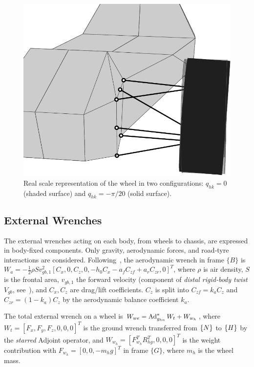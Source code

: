 \begin{figure}[h]
	\centering
	\includegraphics[scale = .6]{Images/camber_showing}
	\caption{Real scale representation of the wheel in two configurations: $q_{hk}=0$ (shaded surface) and $q_{hk}=-\pi/20$ (solid surface).}
	\label{fig:camber_showing}
\end{figure}
\subsection{External Wrenches}
\label{sec:extwren}
The external wrenches acting on each body, from wheels to chassis, are expressed in body-fixed components. Only gravity, aerodynamic forces, and road-tyre interactions are considered. Following~\cite{Guiggiani:book:2023}, the aerodynamic wrench in frame $\{B\}$ is $W_a=-\frac{1}{2}\rho S v_{gb,1}^2 [C_x, 0, C_z, 0, -h_0 C_x - a_f C_{zf} + a_r C_{zr}, 0]^T$, where $\rho$ is air density, $S$ is the frontal area, $v_{gb,1}$ the forward velocity (component of \emph{distal rigid-body twist} $V_{gb}$, see~\cite[p.~4]{Domenighini:Designs:2023}), and $C_x, C_z$ are drag/lift coefficients. $C_z$ is split into $C_{zf}=k_a C_z$ and $C_{zr}=(1-k_a)C_z$ by the aerodynamic balance coefficient $k_a$.

The total external wrench on a wheel is $W_{we}=\operatorname{Ad}_{g_{hn}}^*W_t+W_{w_h}$,
where $W_t=[F_x, F_y, F_z, 0, 0, 0]^T$ is the ground wrench transferred from $\left\{N\right\}$ to $\left\{H\right\}$ by the \emph{starred} Adjoint operator, and $W_{w_h}=[F_{w_h}^T R_{hg}^T, 0, 0, 0]^T$ is the weight contribution with $F_{w_h}=[0, 0, -m_h g]^T$ in frame $\{G\}$, where $m_h$ is the wheel mass.

